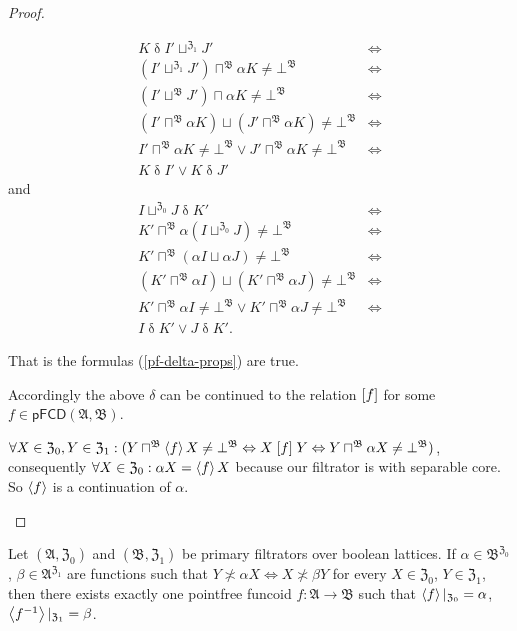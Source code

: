 \begin{proof}
\begin{widedisorder}
\begin{align*}
K\mathrel{\delta}I'\sqcup^{\mathfrak{Z}_{1}}J' & \Leftrightarrow\\
(I'\sqcup^{\mathfrak{Z}_{1}}J')\sqcap^{\mathfrak{B}}\alpha K\neq\bot^{\mathfrak{B}} & \Leftrightarrow\\
(I'\sqcup^{\mathfrak{B}}J')\sqcap\alpha K\neq\bot^{\mathfrak{B}} & \Leftrightarrow\\
(I'\sqcap^{\mathfrak{B}}\alpha K)\sqcup(J'\sqcap^{\mathfrak{B}}\alpha K)\neq\bot^{\mathfrak{B}} & \Leftrightarrow\\
I'\sqcap^{\mathfrak{B}}\alpha K\neq\bot^{\mathfrak{B}}\vee J'\sqcap^{\mathfrak{B}}\alpha K\neq\bot^{\mathfrak{B}} & \Leftrightarrow\\
K\mathrel{\delta}I'\vee K\mathrel{\delta}J'
\end{align*}
and
\begin{align*}
I\sqcup^{\mathfrak{Z}_{0}}J\mathrel{\delta}K' & \Leftrightarrow\\
K'\sqcap^{\mathfrak{B}}\alpha(I\sqcup^{\mathfrak{Z}_{0}}J)\neq\bot^{\mathfrak{B}} & \Leftrightarrow\\
K'\sqcap^{\mathfrak{B}}(\alpha I\sqcup\alpha J)\neq\bot^{\mathfrak{B}} & \Leftrightarrow\\
(K'\sqcap^{\mathfrak{B}}\alpha I)\sqcup(K'\sqcap^{\mathfrak{B}}\alpha J)\neq\bot^{\mathfrak{B}} & \Leftrightarrow\\
K'\sqcap^{\mathfrak{B}}\alpha I\neq\bot^{\mathfrak{B}}\vee K'\sqcap^{\mathfrak{B}}\alpha J\neq\bot^{\mathfrak{B}} & \Leftrightarrow\\
I\mathrel{\delta}K'\vee J\mathrel{\delta}K'.
\end{align*}



That is the formulas (\ref{pf-delta-props}) are true.


Accordingly the above $\delta$ can be continued to the relation $\mathrel{\left[f\right]}$
for some $f\in\mathsf{pFCD}(\mathfrak{A},\mathfrak{B})$.


$\forall X\in\mathfrak{Z}_{0},Y\in\mathfrak{Z}_{1}:(Y\sqcap^{\mathfrak{B}}\left\langle f\right\rangle X\neq\bot^{\mathfrak{B}}\Leftrightarrow X\mathrel{\left[f\right]}Y\Leftrightarrow Y\sqcap^{\mathfrak{B}}\alpha X\neq\bot^{\mathfrak{B}})$,
consequently $\forall X\in\mathfrak{Z}_{0}:\alpha X=\left\langle f\right\rangle X$ because
our filtrator is with separable core. So $\left\langle f\right\rangle$ is a continuation
of $\alpha$.

\end{widedisorder}
\end{proof}
\begin{thm}
Let $(\mathfrak{A},\mathfrak{Z}_{0})$ and $(\mathfrak{B},\mathfrak{Z}_{1})$
be primary filtrators over boolean lattices. If $\alpha\in\mathfrak{B}^{\mathfrak{Z}_{0}}$,
$\beta\in\mathfrak{A}^{\mathfrak{Z}_{1}}$ are functions such that
$Y\nasymp\alpha X\Leftrightarrow X\nasymp\beta Y$ for every $X\in\mathfrak{Z}_{0}$,
$Y\in\mathfrak{Z}_{1}$, then there exists exactly one pointfree funcoid $f:\mathfrak{A}\rightarrow\mathfrak{B}$
such that $\left\langle f\right\rangle|_{\mathfrak{Z}_0}=\alpha$, $\left\langle f^{-1}\right\rangle|_{\mathfrak{Z}_1}=\beta$.\end{thm}
